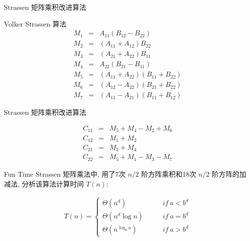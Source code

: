 \documentclass[fontset=fandol,UTF8,fleqn]{beamer}
\begin{document}
\begin{frame}{Strassen 矩阵乘积改进算法}
  \begin{exampleblock}{Volker Strassen 算法}
\begin{eqnarray*}
  M_1 & = & A_{11}(B_{12}-B_{22})   \\
  M_2 & = & (A_{11}+A_{12})B_{22}  \\
  M_3 & = & (A_{21}+A_{22})B_{11}  \\
  M_4 & = & A_{22}(B_{21}-B_{11})   \\
  M_5 & = & (A_{11}+A_{22})(B_{11}+B_{22})   \\
  M_6 & = & (A_{12}-A_{22})(B_{21}+B_{22})  \\
  M_7 & = & (A_{11}-A_{21})(B_{11}+B_{12})  
\end{eqnarray*}
\end{exampleblock}
\end{frame}

\begin{frame}{Strassen 矩阵乘积改进算法}
  \begin{exampleblock}{}
    \begin{eqnarray*}
  C_{11} & = & M_5+M_4-M_2+M_6   \\
C_{12} & = & M_1+M_2   \\
C_{21} & = & M_3+M_4   \\
C_{22} & = & M_5+M_1-M_3-M_7   
\end{eqnarray*}
\end{exampleblock}
\end{frame}

\begin{frame}{Fun Time}
 Strassen 矩阵乘法中, 用了7次 $n/2$ 阶方阵乘积和18次 $n/2$ 阶方阵的加减法,
 分析该算法计算时间 $T(n)$:
 \begin{exampleblock}{}
     \begin{eqnarray*}
    T(n) = \left\{
        \begin{array}{ll}
          \Theta(n^d) &\qquad  if\ a < b^d  \\
\Theta(n^d\log n) &\qquad  if \ a = b^d  \\
\Theta(n^{\log_ba}) &\qquad  if\ a > b^d
        \end{array}
\right. 
  \end{eqnarray*}
\end{exampleblock}
\end{frame}
\end{document}
